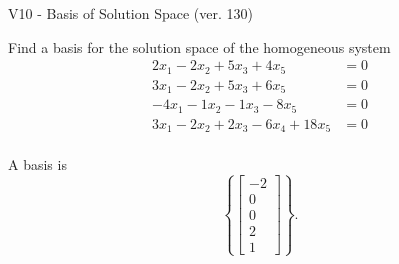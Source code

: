 \begin{exercise}
  \begin{exerciseTitle}V10 - Basis of Solution Space (ver. 130)\end{exerciseTitle}
  \begin{exerciseStatement}
    Find a basis for the solution space of the homogeneous system 
\begin{align*}
 2 x_ 1 -2 x_ 2 + 5 x_ 3 + 4 x_ 5 &= 0  \\ 
  3 x_ 1 -2 x_ 2 + 5 x_ 3 + 6 x_ 5 &= 0  \\ 
  -4 x_ 1 -1 x_ 2 -1 x_ 3 -8 x_ 5 &= 0  \\ 
  3 x_ 1 -2 x_ 2 + 2 x_ 3 -6 x_ 4 + 18 x_ 5 &= 0  \\ 
 \end{align*}


 
  \end{exerciseStatement}

  \begin{exerciseAnswer}
   A basis is   
\[\left\{\left[\begin{array}{c}
-2 \\
0 \\
0 \\
2 \\
1
\end{array}\right]\right\}.\]

  


  \end{exerciseAnswer}
\end{exercise}